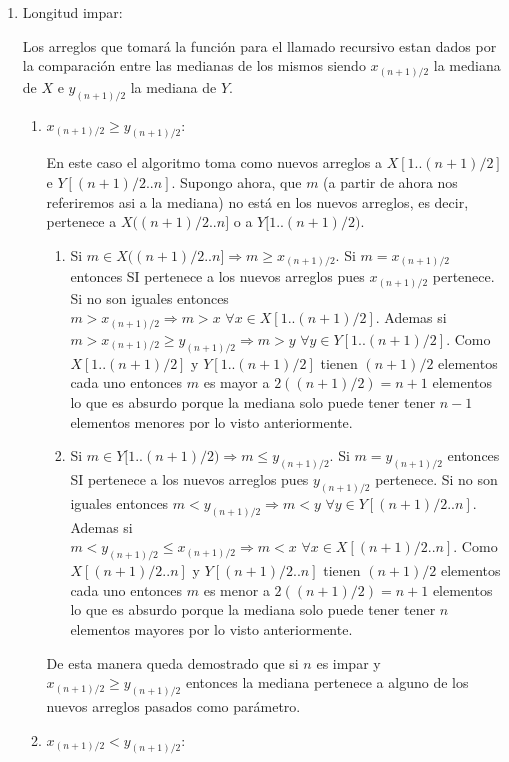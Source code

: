 \documentclass[a4paper,10pt] {article}
\begin{document}
\begin{enumerate}
 \item Longitud impar:
  
Los arreglos que tomar\'a la funci\'on para el llamado recursivo estan dados por la comparaci\'on entre las medianas de los mismos siendo $x_{(n+1)/2}$ la mediana de $X$ e $y_{(n+1)/2}$ la mediana de $Y$.
\begin{enumerate}
\item $x_{(n+1)/2}\geq y_{(n+1)/2}$:

En este caso el algoritmo toma como nuevos arreglos a $X[1..(n+1)/2]$ e $Y[(n+1)/2..n]$. Supongo ahora, que $m$ (a partir de ahora nos referiremos asi a la mediana) no est\'a en los nuevos arreglos, es decir, pertenece a $X((n+1)/2..n]$ o a $Y[1..(n+1)/2)$.
\begin{enumerate}
\item
 Si $m \in X((n+1)/2..n] \Longrightarrow m \geq x_{(n+1)/2}$. Si $m=x_{(n+1)/2}$ entonces SI pertenece a los nuevos arreglos pues $x_{(n+1)/2}$ pertenece. Si no son iguales entonces $m>x_{(n+1)/2} \Longrightarrow m>x \,\,\forall x \in X[1..(n+1)/2]$. Ademas si $m>x_{(n+1)/2}\geq y_{(n+1)/2} \Longrightarrow m>y \,\,\forall y \in Y[1..(n+1)/2]$. Como $X[1..(n+1)/2]$ y $Y[1..(n+1)/2]$ tienen $(n+1)/2$ elementos cada uno entonces $m$ es mayor a $2((n+1)/2)=n+1$ elementos lo que es absurdo porque la mediana solo puede tener tener $n-1$ elementos menores por lo visto anteriormente.
\item
 Si $m \in Y[1..(n+1)/2) \Longrightarrow m \leq y_{(n+1)/2}$. Si $m=y_{(n+1)/2}$ entonces SI pertenece a los nuevos arreglos pues $y_{(n+1)/2}$ pertenece. Si no son iguales entonces $m<y_{(n+1)/2} \Longrightarrow m<y \,\,\forall y \in Y[(n+1)/2..n]$. Ademas si $m<y_{(n+1)/2}\leq x_{(n+1)/2} \Longrightarrow m<x \,\,\forall x \in X[(n+1)/2..n]$. Como $X[(n+1)/2..n]$ y $Y[(n+1)/2..n]$ tienen $(n+1)/2$ elementos cada uno entonces $m$ es menor a $2((n+1)/2)=n+1$ elementos lo que es absurdo porque la mediana solo puede tener tener $n$ elementos mayores por lo visto anteriormente.
\end{enumerate}

De esta manera queda demostrado que si $n$ es impar y $x_{(n+1)/2}\geq y_{(n+1)/2}$ entonces la mediana pertenece a alguno de los nuevos arreglos pasados como par\'ametro.

\item $x_{(n+1)/2}<y_{(n+1)/2}$:


\end{enumerate}
\end{enumerate}
\end{document}
